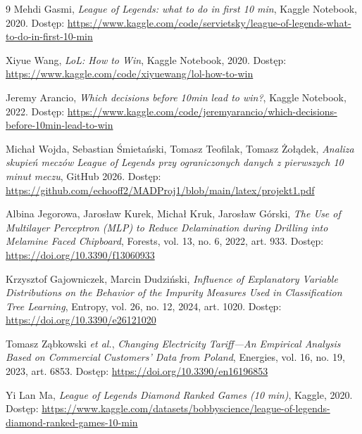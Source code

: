 \documentclass[twoside]{customStyle}
\begin{document}

\begin{thebibliography}{9}
Mehdi Gasmi,
\textit{League of Legends: what to do in first 10 min},
Kaggle Notebook, 2020.  
Dostęp: \url{https://www.kaggle.com/code/servietsky/league-of-legends-what-to-do-in-first-10-min}

Xiyue Wang,
\textit{LoL: How to Win},
Kaggle Notebook, 2020.  
Dostęp: \url{https://www.kaggle.com/code/xiyuewang/lol-how-to-win}

Jeremy Arancio,
\textit{Which decisions before 10min lead to win?},
Kaggle Notebook, 2022.  
Dostęp: \url{https://www.kaggle.com/code/jeremyarancio/which-decisions-before-10min-lead-to-win}

Michał Wojda, Sebastian Śmietański, Tomasz Teofilak, Tomasz Żołądek,
\textit{Analiza skupień meczów League of Legends przy ograniczonych danych z pierwszych 10 minut meczu},
GitHub 2026.  
Dostęp: \url{https://github.com/echooff2/MADProj1/blob/main/latex/projekt1.pdf}

Albina Jegorowa, Jarosław Kurek, Michał Kruk, Jarosław Górski,
\textit{The Use of Multilayer Perceptron (MLP) to Reduce Delamination during Drilling into Melamine Faced Chipboard},
Forests, vol. 13, no. 6, 2022, art. 933.  
Dostęp: \url{https://doi.org/10.3390/f13060933}

Krzysztof Gajowniczek, Marcin Dudziński,
\textit{Influence of Explanatory Variable Distributions on the Behavior of the Impurity Measures Used in Classification Tree Learning},
Entropy, vol. 26, no. 12, 2024, art. 1020.  
Dostęp: \url{https://doi.org/10.3390/e26121020}

Tomasz Ząbkowski \textit{et al.},
\textit{Changing Electricity Tariff—An Empirical Analysis Based on Commercial Customers’ Data from Poland},
Energies, vol. 16, no. 19, 2023, art. 6853.  
Dostęp: \url{https://doi.org/10.3390/en16196853}

Yi Lan Ma,
\textit{League of Legends Diamond Ranked Games (10 min)},
Kaggle, 2020.
Dostęp: \url{https://www.kaggle.com/datasets/bobbyscience/league-of-legends-diamond-ranked-games-10-min}
\end{thebibliography}

\end{document}
